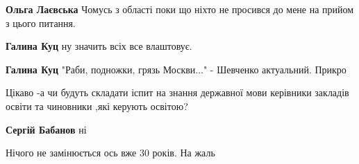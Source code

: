 \begin{itemize}
\begin{itemize}
\textbf{Ольга Лаєвська} Чомусь з області поки що ніхто не просився до мене на прийом з цього питання.

 
\textbf{Галина Куц} ну значить всіх все влаштовує.

 
\textbf{Галина Куц} "Раби, подножки, грязь Москви..." - Шевченко актуальний. Прикро
\end{itemize}

 
Цікаво -а чи будуть складати іспит на знання державної мови керівники закладів
освіти та чиновники ,які керують освітою?

\begin{itemize}
 
\textbf{Сергій Бабанов} ні
\end{itemize}

 
Нічого не замінюється ось вже 30 років. На жаль

\begin{itemize}
 

\end{itemize}
\end{itemize}
